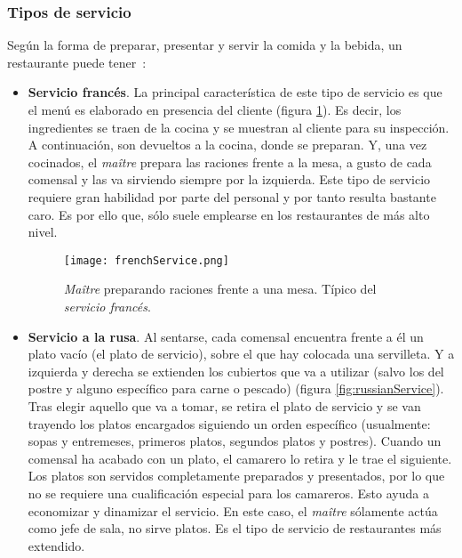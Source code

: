     \subsubsection{Tipos de servicio}
  Según la forma de preparar, presentar y servir la comida y la bebida, un
  restaurante puede tener~\cite{bib:wiki}:
  \begin{itemize}
  \item \textbf{Servicio francés}. La principal característica de este tipo de
  servicio es que el menú es elaborado en presencia del cliente (figura
  \ref{fig:frenchService}). Es decir, los ingredientes se traen de la cocina y
  se muestran al cliente para su inspección. A continuación, son devueltos a la
  cocina, donde se preparan. Y, una vez cocinados, el \emph{maître} prepara las
  raciones frente a la mesa, a gusto de cada comensal y las va sirviendo 
  siempre por la izquierda. Este tipo de servicio requiere gran habilidad por 
  parte del personal y por tanto resulta bastante caro. Es por ello que, sólo 
  suele emplearse en los restaurantes de más alto nivel.

  \begin{figure}[!h]
    \begin{center}
      \texttt{[image: frenchService.png]}
      \caption{\emph{Maître} preparando raciones frente a una mesa. Típico del 
      \emph{servicio francés}.}
      \label{fig:frenchService}
    \end{center}
  \end{figure}

  \item \textbf{Servicio a la rusa}. Al sentarse, cada comensal encuentra 
  frente a él un plato vacío (el plato de servicio), sobre el que hay colocada 
  una servilleta. Y a izquierda y derecha se extienden los cubiertos que va a
  utilizar (salvo los del postre y alguno específico para carne o pescado)
  (figura \ref{fig:russianService}). Tras elegir aquello que va a tomar, se
  retira el plato de servicio y se van trayendo los platos encargados 
  siguiendo un orden específico (usualmente: sopas y entremeses, primeros 
  platos, segundos platos y postres). Cuando un comensal ha acabado con un 
  plato, el camarero lo retira y le trae el siguiente. Los platos son servidos 
  completamente preparados y presentados, por lo que no se requiere una 
  cualificación especial para los camareros. Esto ayuda a economizar y 
  dinamizar el servicio. En este caso, el \emph{maître} sólamente actúa como 
  jefe de sala, no sirve platos. Es el tipo de servicio de restaurantes más 
  extendido.


\end{itemize}
